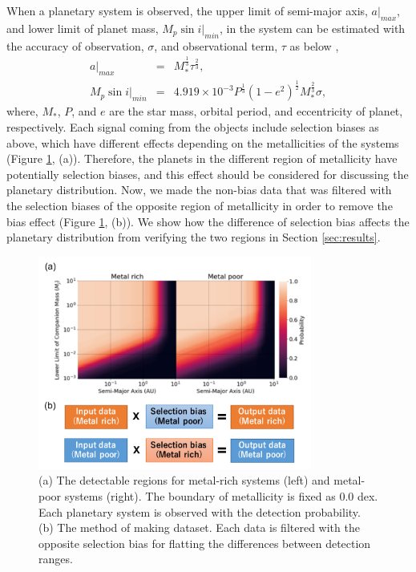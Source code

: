\documentclass[twocolumn, dvipdfmx]{aastex62}
\begin{document}
\begin{CJK*}{UTF8}{min}
When a planetary system is observed, the upper limit of semi-major axis, $a|_{max}$, and lower limit of planet mass, $M_p\sin i|_{min}$, in the system can be estimated with the accuracy of observation, $\sigma$, and observational term, $\tau$ as below \citep{2008ApJ...677.1324T},
\begin{eqnarray}
a|_{max} &=& M_{*}^{\frac{1}{3}}\tau^{\frac{2}{3}} , \\
M_p\sin i|_{min} &=& 4.919\times10^{-3}P^{\frac{1}{3}}(1-e^2)^{\frac{1}{2}}M_{*}^{\frac{2}{3}}\sigma ,
\end{eqnarray}
where, $M_*$, $P$, and $e$ are the star mass, orbital period, and eccentricity of planet, respectively. Each signal coming from the objects include selection biases as above, which have different effects depending on the metallicities of the systems (Figure \ref{fig:bias}, (a)). Therefore, the planets in the different region of metallicity have potentially selection biases, and this effect should be considered for discussing the planetary distribution. Now, we made the non-bias data that was filtered with the selection biases of the opposite region of metallicity in order to remove the bias effect (Figure \ref{fig:bias}, (b)). We show how the difference of selection bias affects the planetary distribution from verifying the two regions in Section \ref{sec:results}.


\begin{figure}[t]
\begin{center}
\includegraphics[width=9cm]{../../../Figure/selection_bias.pdf}
\caption{(a) The detectable regions for metal-rich systems (left) and metal-poor systems (right). The boundary of metallicity is fixed as 0.0 dex. Each planetary system is observed with the detection probability. (b) The method of making dataset. Each data is filtered with the opposite selection bias for flatting the differences between detection ranges. \label{fig:bias}}
\end{center}
\end{figure}



\end{CJK*}
\end{document}
